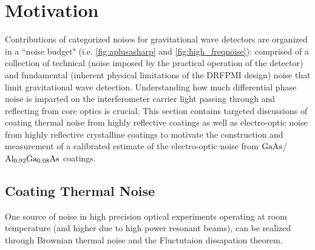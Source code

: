 
\section{Motivation}
Contributions of categorized noises for gravitational wave detectors are organized in a ``noise budget" (i.e. \autoref{fig:aplusasharp} and \autoref{fig:high_freqnoise}): comprised of a collection of technical (noise imposed by the practical operation of the detector) and fundamental (inherent physical limitations of the DRFPMI design) noise that limit gravitational wave detection. Understanding how much differential phase noise is imparted on the interferometer carrier light passing through and reflecting from core optics is crucial. This section contains targeted discussions of coating thermal noise from highly reflective coatings as well as electro-optic noise from highly reflective crystalline coatings to motivate the construction and measurement of a calibrated estimate of the electro-optic noise from $\mathrm{GaAs}$/$\mathrm{Al_{0.92}Ga_{0.08}As}$ coatings.

\subsection{Coating Thermal Noise}
One source of noise in high precision optical experiments operating at room temperature (and higher due to high power resonant beams), can be realized through Brownian thermal noise and the Fluctutaion dissapation theorem. 

